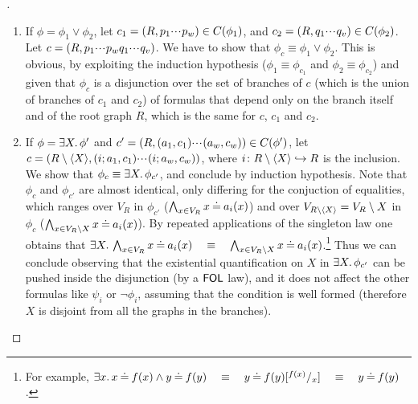 \begin{proof}[]
\begin{enumerate}
\item 
If $\phi = \phi_1 \lor \phi_2$, let $c_1 = (R,p_1{\cdotp\mkern-2mu\cdotp\mkern-2mu\cdotp\mkern1mu} p_w) \in C({\phi_1})$, and $c_2 = (R,q_1{\cdotp\mkern-2mu\cdotp\mkern-2mu\cdotp\mkern1mu} q_v) \in C({\phi_2})$. Let $c = (R,p_1{\cdotp\mkern-2mu\cdotp\mkern-2mu\cdotp\mkern1mu} p_wq_1{\cdotp\mkern-2mu\cdotp\mkern-2mu\cdotp\mkern1mu} q_v)$. We have to show that $\phi_c \equiv \phi_1 \lor \phi_2$. This is obvious, by exploiting the induction hypothesis ($\phi_1 \equiv \phi_{c_1}$ and $\phi_2 \equiv \phi_{c_2}$) and given that $\phi_c$ is a disjunction over the set of branches of $c$ (which is the union of branches of $c_1$ and $c_2$) of formulas that depend only on the branch itself and of the root graph $R$, which is the same for $c$, $c_1$ and $c_2$.
\item 
If $\phi = \exists X .\, \phi'$ and $c' = (R,(a_1,c_1){\cdotp\mkern-2mu\cdotp\mkern-2mu\cdotp\mkern1mu} (a_w,c_w)) \in C({\phi'})$, let $c =  (R\setminus \langle X \rangle,(i;a_1,c_1){\cdotp\mkern-2mu\cdotp\mkern-2mu\cdotp\mkern1mu} (i;a_w,c_w))$, where $i\colon R\setminus \langle X \rangle \hookrightarrow R$ is the inclusion. We show that $\phi_c \equiv\exists X.\, \phi_{c'}$, and conclude by induction hypothesis. Note that $\phi_c$ and $\phi_{c'}$ are almost identical, only differing for the conjuction of equalities, which ranges over $V_R$ in $\phi_{c'}$ ($\bigwedge_{x\in V_R} x \mathbin{\doteq} a_i(x)$) and over $V_{R\setminus \langle X \rangle} = V_R \setminus X$ in $\phi_{c}$ ($\bigwedge_{x\in {V_R\setminus X}} x \mathbin{\doteq} a_i(x)$). By repeated applications of the singleton law one obtains that $\exists X.\, \bigwedge_{x\in V_R} x \mathbin{\doteq} a_i(x)\quad \equiv \quad \bigwedge_{x\in {V_R\setminus X}} x \mathbin{\doteq} a_i(x)$.\footnote{For example, $\exists x.\, x \mathbin{\doteq} f(x) \wedge y \mathbin{\doteq} f(y) \quad \equiv \quad  y \mathbin{\doteq} f(y)[^{f(x)}/_x] \quad \equiv \quad  y \mathbin{\doteq} f(y)$.}
Thus we can conclude observing that the existential quantification on $X$ in $\exists X.\, \phi_{c'}$ can be pushed inside the disjunction (by a $\mathsf{FOL}$ law), and it does not affect the other formulas like $\psi_i$ or $\neg \phi_i$, assuming that the condition is well formed (therefore $X$ is disjoint from all the graphs in the branches).  
\end{enumerate}
\end{proof}





